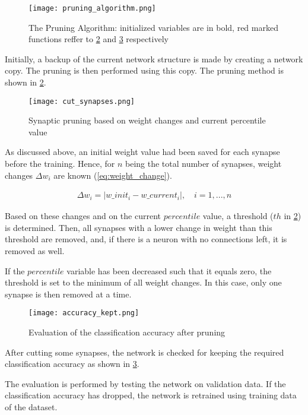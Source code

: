 \begin{figure}[H]
  \centering
  \texttt{[image: pruning\_algorithm.png]}
  \caption{The Pruning Algorithm: initialized variables are in bold, red marked functions reffer to \ref{img:cut_synapses} and \ref{img:accuracy_kept} respectively}
  \label{img:pruning_algorithm}
\end{figure}

Initially, a backup of the current network structure is made by creating a network copy. The pruning is then performed using this copy. The pruning method is shown in \cref{img:cut_synapses}.

\begin{figure}[H]
  \centering
  \texttt{[image: cut\_synapses.png]}
  \caption{Synaptic pruning based on weight changes and current percentile value}
  \label{img:cut_synapses}
\end{figure}

As discussed above, an initial weight value had been saved for each synapse before the training. Hence, for $ n $ being the total number of synapses, weight changes $ \Delta w_i $ are known (\ref{eq:weight_change}).

\begin{align} \label{eq:weight_change}
\Delta w_i = |w\_init_i - w\_current_i|, \quad i = 1, ..., n
\end{align}

Based on these changes and on the current $ percentile $ value, a threshold ($ th $ in \cref{img:cut_synapses}) is determined. Then, all synapses with a lower change in weight than this threshold are removed, and, if there is a neuron with no connections left, it is removed as well.

If the $ percentile $ variable has been decreased such that it equals zero, the threshold is set to the minimum of all weight changes. In this case, only one synapse is then removed at a time.

\begin{figure}[H]
  \centering
  \texttt{[image: accuracy\_kept.png]}
  \caption{Evaluation of the classification accuracy after pruning}
  \label{img:accuracy_kept}
\end{figure}

After cutting some synapses, the network is checked for keeping the required classification accuracy as shown in \cref{img:accuracy_kept}.

The evaluation is performed by testing the network on validation data. If the classification accuracy has dropped, the network is retrained using training data of the dataset.

